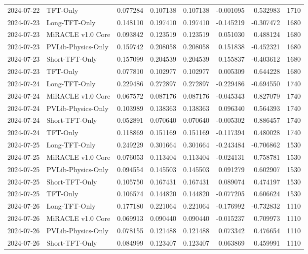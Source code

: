 \begin{tabular}{llrrrrrr}
2024-07-22 & TFT-Only & 0.077284 & 0.107138 & 0.107138 & -0.001095 & 0.532983 & 1710 \\
2024-07-23 & Long-TFT-Only & 0.148110 & 0.197410 & 0.197410 & -0.145219 & -0.307472 & 1680 \\
2024-07-23 & MiRACLE v1.0 Core & 0.093842 & 0.123519 & 0.123519 & 0.051030 & 0.488124 & 1680 \\
2024-07-23 & PVLib-Physics-Only & 0.159742 & 0.208058 & 0.208058 & 0.151838 & -0.452321 & 1680 \\
2024-07-23 & Short-TFT-Only & 0.157099 & 0.204539 & 0.204539 & 0.155837 & -0.403612 & 1680 \\
2024-07-23 & TFT-Only & 0.077810 & 0.102977 & 0.102977 & 0.005309 & 0.644228 & 1680 \\
2024-07-24 & Long-TFT-Only & 0.229486 & 0.272897 & 0.272897 & -0.229486 & -0.694550 & 1740 \\
2024-07-24 & MiRACLE v1.0 Core & 0.067572 & 0.087176 & 0.087176 & -0.045343 & 0.827079 & 1740 \\
2024-07-24 & PVLib-Physics-Only & 0.103989 & 0.138363 & 0.138363 & 0.096340 & 0.564393 & 1740 \\
2024-07-24 & Short-TFT-Only & 0.052891 & 0.070640 & 0.070640 & -0.005302 & 0.886457 & 1740 \\
2024-07-24 & TFT-Only & 0.118869 & 0.151169 & 0.151169 & -0.117394 & 0.480028 & 1740 \\
2024-07-25 & Long-TFT-Only & 0.249229 & 0.301664 & 0.301664 & -0.243484 & -0.706862 & 1530 \\
2024-07-25 & MiRACLE v1.0 Core & 0.076053 & 0.113404 & 0.113404 & -0.024131 & 0.758781 & 1530 \\
2024-07-25 & PVLib-Physics-Only & 0.094554 & 0.145503 & 0.145503 & 0.091279 & 0.602907 & 1530 \\
2024-07-25 & Short-TFT-Only & 0.105750 & 0.167431 & 0.167431 & 0.089074 & 0.474197 & 1530 \\
2024-07-25 & TFT-Only & 0.106574 & 0.144820 & 0.144820 & -0.077205 & 0.606624 & 1530 \\
2024-07-26 & Long-TFT-Only & 0.177180 & 0.221064 & 0.221064 & -0.176992 & -0.732832 & 1110 \\
2024-07-26 & MiRACLE v1.0 Core & 0.069913 & 0.090440 & 0.090440 & -0.015237 & 0.709973 & 1110 \\
2024-07-26 & PVLib-Physics-Only & 0.078155 & 0.121488 & 0.121488 & 0.073342 & 0.476654 & 1110 \\
2024-07-26 & Short-TFT-Only & 0.084999 & 0.123407 & 0.123407 & 0.063869 & 0.459991 & 1110 \\

\end{tabular}
